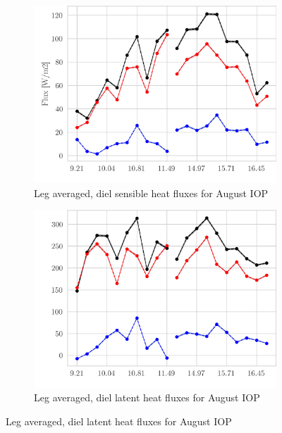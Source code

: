\documentclass[draft]{agujournal2019}
\begin{document}
\begin{figure}[hbtp]
 \medskip
 \begin{subfigure}{0.49\textwidth}
     \includegraphics[width=\textwidth]{figures_main/H_IOP02_diel.png}
     \caption{Leg averaged, diel sensible heat fluxes for August IOP}
     \label{fig:H_IOP02_diel}
 \end{subfigure}
 \hfill
 \begin{subfigure}{0.49\textwidth}
     \includegraphics[width=\textwidth]{figures_main/LE_IOP02_diel.png}
     \caption{Leg averaged, diel latent heat fluxes for August IOP}
     \label{fig:LE_IOP02_diel}
 \end{subfigure}


\end{figure}
\end{document}
